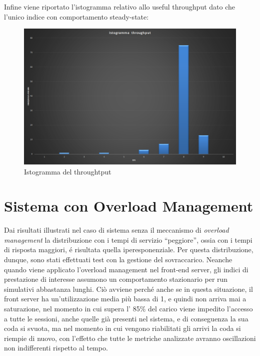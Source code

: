 Infine viene riportato l'istogramma relativo allo useful throughput dato che l'unico
indice con comportamento steady-state:

\begin{figure}[H]
 \centering
 \includegraphics[scale=0.45]{img/istogramma.png}
 \caption[Istogramma del throughtput]{Istogramma del throughtput}
 \label{fig:Istogramma del throughtput}
\end{figure}

\section{Sistema con Overload Management}

Dai risultati illustrati nel caso di sistema senza il meccanismo di \textit{overload 
management} la distribuzione con i tempi di servizio ``peggiore'', ossia con i tempi
di risposta maggiori, \'e risultata quella iperesponenziale. 
Per questa distribuzione, dunque, sono stati effettuati test con la gestione del sovraccarico.
Neanche quando viene applicato l'overload management nel front-end server, gli indici di prestazione
di interesse assumono un comportamento stazionario per run simulativi abbastanza lunghi.
Ci\`o avviene perch\'e anche se in questa situazione, il front server ha un'utilizzazione media pi\`u bassa
di 1, e quindi non arriva mai a saturazione, nel momento in cui supera l' 85\% del carico viene impedito l'accesso
a tutte le sessioni, anche quelle gi\`a presenti nel sistema, e di conseguenza la sua coda si svuota, ma
nel momento in cui vengono riabilitati gli arrivi la coda si riempie di nuovo, con l'effetto che tutte le
metriche analizzate avranno oscillazioni non indifferenti rispetto al tempo.

